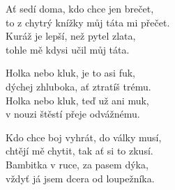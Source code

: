
\ve{}
Ať sedí doma, kdo chce jen brečet,\\
to z chytrý knížky můj táta mi přečet.\\
Kuráž je lepší, než pytel zlata,\\
tohle mě kdysi učil můj táta.

\cho{}
Holka nebo kluk, je to asi fuk,\\
dýchej zhluboka, ať ztratíš trému.\\
Holka nebo kluk, teď už ani muk,\\
v nouzi štěstí přeje odvážnému.

\ve{}
Kdo chce boj vyhrát, do války musí,\\
chtějí mě chytit, tak ať si to zkusí.\\
Bambitka v ruce, za pasem dýka,\\
vždyť já jsem dcera od loupežníka.\\

\cho{}
\esong